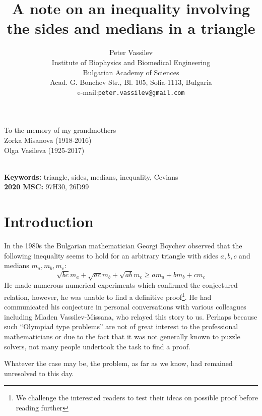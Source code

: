 \documentclass[a4paper,12pt]{article}
\author{Peter Vassilev\\
Institute of Biophysics and Biomedical Engineering\\
Bulgarian Academy of Sciences\\
Acad. G. Bonchev Str., Bl. 105, Sofia-1113, Bulgaria\\
e-mail:\texttt{peter.vassilev@gmail.com}
}
\title{A note on an inequality involving the sides and medians in a triangle}
\date{}
\begin{document}
\maketitle

\hfill To the memory of my grandmothers \\
\mbox{}\hfill Zorka Misanova (1918-2016) \\
\mbox{}\hfill Olga Vasileva (1925-2017)

\\
\textbf{Keywords:} triangle, sides, medians, inequality, Cevians\\
\textbf{2020 MSC:} 97H30, 26D99 


\section{Introduction}\label{intro} In the 1980s the Bulgarian mathematician Georgi Boychev observed that the following inequality seems to hold for an arbitrary triangle with sides $a,b,c$ and medians $m_a,m_b,m_c$:
\begin{equation}\label{INEQ}
 \sqrt{bc} m_a+ \sqrt{ac} m_b+\sqrt{ab} m_c \geq a m_a+ b m_b+c m_c 
\end{equation}
He made numerous numerical experiments which confirmed the conjectured relation, however, he was unable to find a definitive proof\footnote{We challenge the interested readers to test their ideas on possible proof before reading further}. He had communicated his conjecture in personal conversations with various colleagues including Mladen Vassilev-Missana, who relayed this story to us. Perhaps because such ``Olympiad type problems'' are not of great interest to the professional mathematicians or due to the fact that it was not generally known to puzzle solvers, not many people undertook the task to find a proof.

Whatever the case may be, the problem, as far as we know, had remained unresolved to this day. 
\end{document}
